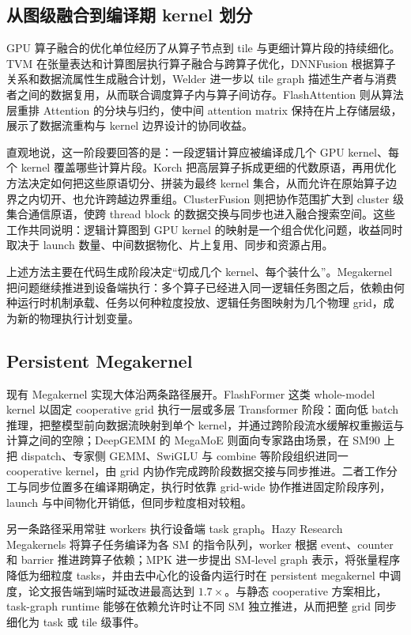 \subsection{从图级融合到编译期 kernel 划分}

GPU 算子融合的优化单位经历了从算子节点到 tile 与更细计算片段的持续细化。TVM 在张量表达和计算图层执行算子融合与跨算子优化，DNNFusion 根据算子关系和数据流属性生成融合计划，Welder 进一步以 tile graph 描述生产者与消费者之间的数据复用，从而联合调度算子内与算子间访存\cite{chen2018tvm,niu2021dnnfusion,shi2023welder}。FlashAttention 则从算法层重排 Attention 的分块与归约，使中间 attention matrix 保持在片上存储层级，展示了数据流重构与 kernel 边界设计的协同收益\cite{dao2022flashattention,dao2023flashattention2,shah2024flashattention3}。

直观地说，这一阶段要回答的是：一段逻辑计算应被编译成几个 GPU kernel、每个 kernel 覆盖哪些计算片段。Korch 把高层算子拆成更细的代数原语，再用优化方法决定如何把这些原语切分、拼装为最终 kernel 集合，从而允许在原始算子边界之内切开、也允许跨越边界重组\cite{hu2024korch}。ClusterFusion 则把协作范围扩大到 cluster 级集合通信原语，使跨 thread block 的数据交换与同步也进入融合搜索空间\cite{luo2025clusterfusion}。这些工作共同说明：逻辑计算图到 GPU kernel 的映射是一个组合优化问题，收益同时取决于 launch 数量、中间数据物化、片上复用、同步和资源占用。

上述方法主要在代码生成阶段决定“切成几个 kernel、每个装什么”。Megakernel 把问题继续推进到设备端执行：多个算子已经进入同一逻辑任务图之后，依赖由何种运行时机制承载、任务以何种粒度投放、逻辑任务图映射为几个物理 grid，成为新的物理执行计划变量。

\subsection{Persistent Megakernel}

现有 Megakernel 实现大体沿两条路径展开。FlashFormer 这类 whole-model kernel 以固定 cooperative grid 执行一层或多层 Transformer 阶段：面向低 batch 推理，把整模型前向数据流映射到单个 kernel，并通过跨阶段流水缓解权重搬运与计算之间的空隙\cite{nrusimha2025flashformer}；DeepGEMM 的 MegaMoE 则面向专家路由场景，在 SM90 上把 dispatch、专家侧 GEMM、SwiGLU 与 combine 等阶段组织进同一 cooperative kernel，由 grid 内协作完成跨阶段数据交接与同步推进\cite{deepgemm2026,deepgemmPr360}。二者工作分工与同步位置多在编译期确定，执行时依靠 grid-wide 协作推进固定阶段序列，launch 与中间物化开销低，但同步粒度相对较粗。

另一条路径采用常驻 workers 执行设备端 task graph。Hazy Research Megakernels 将算子任务编译为各 SM 的指令队列，worker 根据 event、counter 和 barrier 推进跨算子依赖\cite{hazy2025nobubbles,hazyMegakernels2025}；MPK 进一步提出 SM-level graph 表示，将张量程序降低为细粒度 tasks，并由去中心化的设备内运行时在 persistent megakernel 中调度，论文报告端到端时延改进最高达到 $1.7\times$\cite{cheng2025mpk}。与静态 cooperative 方案相比，task-graph runtime 能够在依赖允许时让不同 SM 独立推进，从而把整 grid 同步细化为 task 或 tile 级事件。

